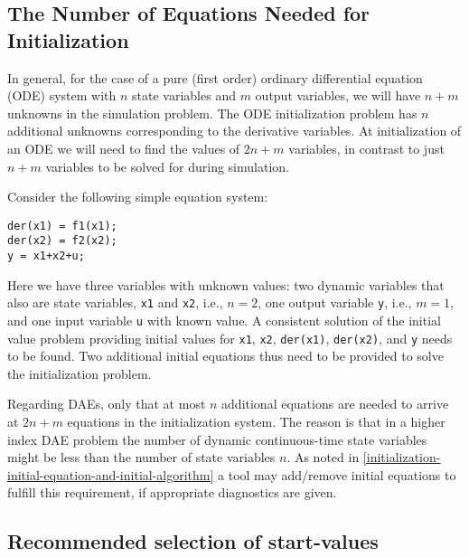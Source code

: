 \subsection{The Number of Equations Needed for Initialization}

\begin{nonnormative}
In general, for the case of a pure (first order) ordinary
differential equation (ODE) system with $n$ state variables and $m$ output
variables, we will have $n+m$ unknowns in the simulation problem. The ODE
initialization problem has $n$ additional unknowns corresponding to the
derivative variables. At initialization of an ODE we will need to find
the values of $2n+m$ variables, in contrast to just $n+m$ variables to be
solved for during simulation.
\end{nonnormative}

\begin{example}
Consider the following simple equation system:
\begin{lstlisting}[language=modelica]
der(x1) = f1(x1);
der(x2) = f2(x2);
y = x1+x2+u;
\end{lstlisting}

Here we have three variables with unknown values: two dynamic
variables that also are state variables, \lstinline!x1! and \lstinline!x2!, i.e.,
$n=2$, one output variable \lstinline!y!, i.e., $m=1$, and one input variable \lstinline!u! with
known value. A consistent solution of the initial value problem
providing initial values for \lstinline!x1!, \lstinline!x2!, \lstinline!der(x1)!,
\lstinline!der(x2)!, and \lstinline!y! needs to be found. Two additional initial
equations thus need to be provided to solve the initialization problem.

Regarding DAEs, only that at most $n$ additional equations are
needed to arrive at $2n+m$ equations in the initialization system. The
reason is that in a higher index DAE problem the number of dynamic
continuous-time state variables might be less than the number of state
variables $n$. As noted in \autoref{initialization-initial-equation-and-initial-algorithm} a tool may add/remove
initial equations to fulfill this requirement, if appropriate
diagnostics are given.
\end{example}

\subsection{Recommended selection of start-values}

